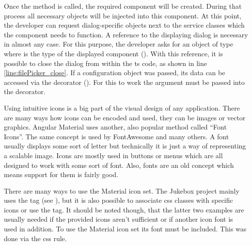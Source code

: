 
Once the  method is called, the required component will be created. During that process all necessary objects will be injected into this component. At this point, the developer can request dialog-specific objects next to the service classes which the component needs to function. A reference to the displaying dialog is necessary in almost any case. For this purpose, the developer asks for an object of type  where  is the type of the displayed component (). With this reference, it is possible to close the dialog from within the \gls{ts} code, as shown in line \ref{line:filePicker_close}. If a configuration object was passed, its data can be accessed via the  decorator (). For this to work the  argument must be passed into the decorator. \cite{matDialog}



Using intuitive icons is a big part of the visual design of any application. There are many ways how icons can be encoded and used, \zB they can be images or vector graphics. Angular Material uses another, also popular method called \enquote{Font Icons}. The same concept is used by FontAwesome \cite{fontAwesome} and many others. A font usually displays some sort of letter but technically it is just a way of representing a scalable image. Icons are mostly used in buttons or menus which are all designed to work with some sort of font. Also, fonts are an old concept which means support for them is fairly good.

There are many ways to use the Material icon set. The Jukebox project mainly uses the  tag (see ), but it is also possible to associate \gls{css} classes with specific icons or use the  tag. It should be noted though, that the latter two examples are usually needed if the provided icons aren't sufficient or if \zB another icon font is used in addition. To use the Material icon set its font must be included. This was done via the  \gls{css} rule.

